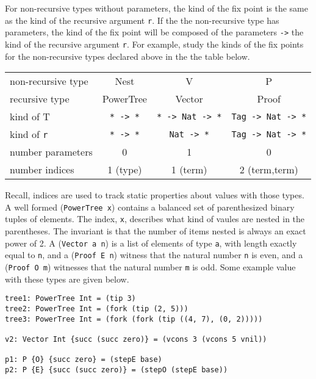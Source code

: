 For non-recursive types without parameters, the kind of the fix point
is the same as the kind of the recursive argument \verb+r+. If the the non-recursive
type has parameters, the kind of the fix point will be composed
of the parameters \verb+->+ the kind of the recursive argument \verb+r+. For example,
study the kinds of the fix points for the non-recursive
types declared above in the the table below.

\vspace*{0.1in}
\begin{tabular}{l|c|c|c}
non-recursive type & Nest          & V                    & P                       \\
recursive type     & PowerTree     & Vector               & Proof                   \\ \hline
kind of T          & \verb+* -> *+ & \verb+* -> Nat -> *+ & \verb+Tag -> Nat -> *+  \\ 
kind of \verb+r+   &  \verb+* -> *+ & \verb+Nat -> *+     & \verb+Tag -> Nat -> *+  \\
number parameters  & 0             & 1                    & 0                       \\ 
number indices     & 1 (type)      & 1 (term)             & 2 (term,term)           \\ 

\end{tabular}

\vspace*{0.1in}
Recall, indices are used to track static properties about values
with those types. A well formed (\verb+PowerTree x+) contains a balanced
set of parenthesized binary tuples of elements. The index, \verb+x+,  describes
what kind of vaules are nested in the parentheses. The invariant is that the
number of items nested is always an exact power of 2. A (\verb+Vector a n+) is a list of elements of
type \verb+a+, with length exactly equal to \verb+n+, and a (\verb+Proof E n+) witness that
the natural number \verb+n+ is even, and a (\verb+Proof O m+) witnesses
that the natural number \verb+m+ is odd. Some example value with these types are
given below.

{\small
\begin{verbatim}
tree1: PowerTree Int = (tip 3)
tree2: PowerTree Int = (fork (tip (2, 5)))
tree3: PowerTree Int = (fork (fork (tip ((4, 7), (0, 2)))))

v2: Vector Int {succ (succ zero)} = (vcons 3 (vcons 5 vnil))

p1: P {O} {succ zero} = (stepE base)
p2: P {E} {succ (succ zero)} = (stepO (stepE base))
\end{verbatim}}

